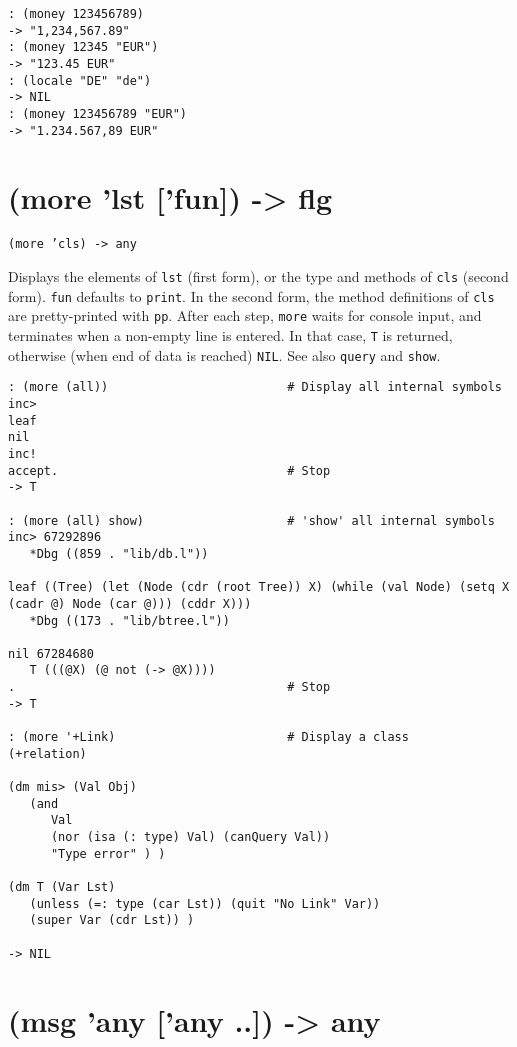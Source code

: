 {{{{{{{\begin{verbatim}
: (money 123456789)
-> "1,234,567.89"
: (money 12345 "EUR")
-> "123.45 EUR"
: (locale "DE" "de")
-> NIL
: (money 123456789 "EUR")
-> "1.234.567,89 EUR"
\end{verbatim}

 
\section{(more 'lst ['fun]) -> flg}
\label{sec-8-1-13-32}


\texttt{(more 'cls) -> any}

Displays the elements of \texttt{lst} (first form), or the type and methods of
\texttt{cls} (second form). \texttt{fun} defaults to \texttt{print}. In the second form, the
method definitions of \texttt{cls} are pretty-printed with \texttt{pp}. After each
step, \texttt{more} waits for console input, and terminates when a non-empty
line is entered. In that case, \texttt{T} is returned, otherwise (when end of
data is reached) \texttt{NIL}. See also \texttt{query} and \texttt{show}.


\begin{verbatim}
: (more (all))                         # Display all internal symbols
inc>
leaf
nil
inc!
accept.                                # Stop
-> T

: (more (all) show)                    # 'show' all internal symbols
inc> 67292896
   *Dbg ((859 . "lib/db.l"))

leaf ((Tree) (let (Node (cdr (root Tree)) X) (while (val Node) (setq X (cadr @) Node (car @))) (cddr X)))
   *Dbg ((173 . "lib/btree.l"))

nil 67284680
   T (((@X) (@ not (-> @X))))
.                                      # Stop
-> T

: (more '+Link)                        # Display a class
(+relation)

(dm mis> (Val Obj)
   (and
      Val
      (nor (isa (: type) Val) (canQuery Val))
      "Type error" ) )

(dm T (Var Lst)
   (unless (=: type (car Lst)) (quit "No Link" Var))
   (super Var (cdr Lst)) )

-> NIL
\end{verbatim}

 
\section{(msg 'any ['any ..]) -> any}
\label{sec-8-1-13-33}


}}}}}}}
